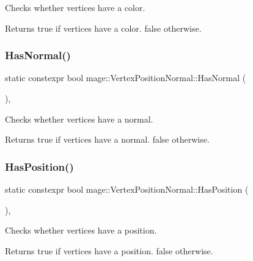 Checks whether vertices have a color.

\begin{DoxyReturn}{Returns}
{\ttfamily true} if vertices have a color. {\ttfamily false} otherwise. 
\end{DoxyReturn}
\hypertarget{structmage_1_1_vertex_position_normal_a28b610b6d83944e77983262869c5aaa1}{}\label{structmage_1_1_vertex_position_normal_a28b610b6d83944e77983262869c5aaa1} 
\subsubsection{\texorpdfstring{Has\+Normal()}{HasNormal()}}
{\footnotesize\ttfamily static constexpr bool mage\+::\+Vertex\+Position\+Normal\+::\+Has\+Normal (\begin{DoxyParamCaption}{ }\end{DoxyParamCaption})\hspace{0.3cm}{\ttfamily [static]}, {\ttfamily [noexcept]}}

Checks whether vertices have a normal.

\begin{DoxyReturn}{Returns}
{\ttfamily true} if vertices have a normal. {\ttfamily false} otherwise. 
\end{DoxyReturn}
\hypertarget{structmage_1_1_vertex_position_normal_a0a356004bb83c2616704bfbe63d936a7}{}\label{structmage_1_1_vertex_position_normal_a0a356004bb83c2616704bfbe63d936a7} 
\subsubsection{\texorpdfstring{Has\+Position()}{HasPosition()}}
{\footnotesize\ttfamily static constexpr bool mage\+::\+Vertex\+Position\+Normal\+::\+Has\+Position (\begin{DoxyParamCaption}{ }\end{DoxyParamCaption})\hspace{0.3cm}{\ttfamily [static]}, {\ttfamily [noexcept]}}

Checks whether vertices have a position.

\begin{DoxyReturn}{Returns}
{\ttfamily true} if vertices have a position. {\ttfamily false} otherwise. 
\end{DoxyReturn}
\hypertarget{structmage_1_1_vertex_position_normal_a049430623134ff702e768bda3bc96860}{}\label{structmage_1_1_vertex_position_normal_a049430623134ff702e768bda3bc96860} 
